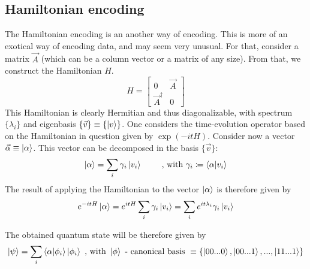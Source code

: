 \subsection*{Hamiltonian encoding}
The Hamiltonian encoding is an another way of encoding. This is more of an exotical way of encoding data, 
and may seem very unusual. For that, consider a matrix $\vec{A}$ (which can be a column vector or a matrix of any size).
From that, we construct the Hamiltonian $H$.
\begin{equation}
  H = 
  \begin{bmatrix}
    0 & \vec{A} \\
    \vec{A}^{\dagger} & 0 
  \end{bmatrix}
\end{equation}
This Hamiltonian is clearly Hermitian and thus diagonalizable, with spectrum $\{\lambda_i\}$ and eigenbasis 
$\{\vec{v}\} \equiv \{\ket{v}\}$. One considers the time-evolution 
operator based on the Hamiltonian in question given by $\exp(-itH)$. Consider now a vector 
$\vec{\alpha} \equiv \ket{\alpha}$. This vector can be decomposed in the basis $\{\vec{v}\}$:
\begin{equation}
  \ket{\alpha} = \sum_i \gamma_i \ket{v_i}\qquad \text{ , with } \gamma_i \coloneq \bra{\alpha}\ket{v_i}
\end{equation}
The result of applying the Hamiltonian to the vector $\ket{\alpha}$ is therefore given by 
\begin{equation}
  e^{-itH}\ket{\alpha} = e^{itH}\sum_i \gamma_i \ket{v_i} = \sum_i e^{it\lambda_i}\gamma_i \ket{v_i}
\end{equation}

The obtained quantum state will be therefore given by 
\begin{equation}
  \ket{\psi} = \sum_i \bra{\alpha}\ket{\phi_i}\ket{\phi_i} \text{ , with } \ket{\phi} \text{ - canonical basis } 
  \equiv \{\ket{00...0}, \ket{00...1}, ..., \ket{11...1} \}
\end{equation}


  








